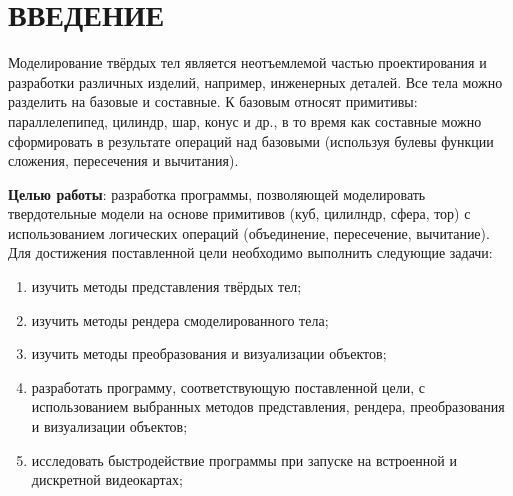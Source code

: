 \section*{ВВЕДЕНИЕ}

Моделирование твёрдых тел является неотъемлемой частью проектирования и разработки различных изделий, например, инженерных деталей. 
Все тела можно разделить на базовые и составные. 
К базовым относят примитивы: параллелепипед, цилиндр, шар, конус и др., в то время как составные можно сформировать в результате операций над базовыми (используя булевы функции сложения, пересечения и вычитания). 

\textbf{Целью работы}: разработка программы, позволяющей моделировать твердотельные модели на основе примитивов (куб, цилилндр, сфера, тор) с использованием логических операций (объединение, пересечение, вычитание).
Для достижения поставленной цели необходимо выполнить следующие задачи:
\begin{enumerate}[label=\arabic*)]
	\item изучить методы представления твёрдых тел;
	\item изучить методы рендера смоделированного тела;
	\item изучить методы преобразования и визуализации объектов;
	\item разработать программу, соответствующую поставленной цели, с использованием выбранных методов представления, рендера, преобразования и визуализации объектов;
	\item исследовать быстродействие программы при запуске на встроенной и дискретной видеокартах;
\end{enumerate}


